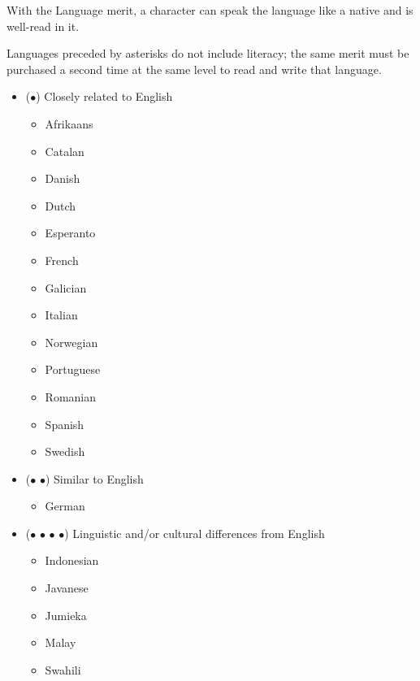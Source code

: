 \documentclass["../Misguided by Starlight.tex"]{subfiles}
\begin{document}
		With the Language merit, a character can speak the language like a native and is well-read in it.

		Languages preceded by asterisks do not include literacy; the same merit must be purchased a second time at the same level to read and write that language.
		
		\begin{itemize}
			\item ($\bullet$) Closely related to English
			\begin{itemize}
				\item Afrikaans
				\item Catalan
				\item Danish
				\item Dutch
				\item Esperanto
				\item French
				\item Galician
				\item Italian
				\item Norwegian
				\item Portuguese
				\item Romanian
				\item Spanish
				\item Swedish
			\end{itemize}
				
			\item ($\bullet$ $\bullet$) Similar to English
			\begin{itemize}
				\item German
			\end{itemize}

			\item ($\bullet$ $\bullet$ $\bullet$ $\bullet$) Linguistic and/or cultural differences from English
			\begin{itemize}
				\item Indonesian
				\item Javanese
				\item Jumieka
				\item Malay
				\item Swahili
			\end{itemize}
		 

\end{itemize}
\end{document}
